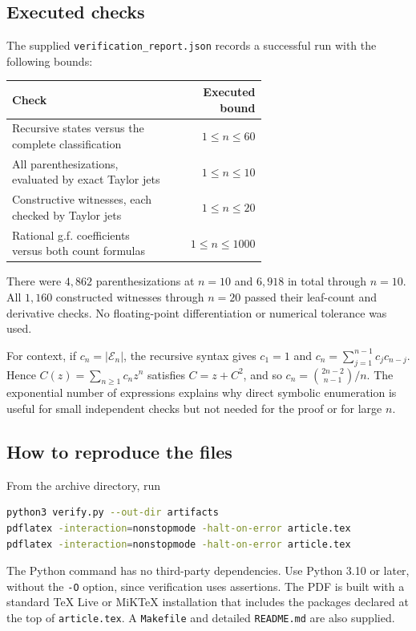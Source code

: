 \documentclass[11pt,letterpaper]{article}
\numberwithin{equation}{section}
\theoremstyle{definition}
\theoremstyle{remark}
\newcommand{\E}{\mathcal E}
\begin{document}
\subsection{Executed checks}
The supplied \texttt{verification\_report.json} records a successful run
with the following bounds:
\begin{center}
\begin{tabular}{@{}p{0.63\linewidth}r@{}}
\toprule
Check & Executed bound\\
\midrule
Recursive states versus the complete classification & $1\le n\le60$\\
All parenthesizations, evaluated by exact Taylor jets & $1\le n\le10$\\
Constructive witnesses, each checked by Taylor jets & $1\le n\le20$\\
Rational g.f. coefficients versus both count formulas & $1\le n\le1000$\\
\bottomrule
\end{tabular}
\end{center}
There were $4{,}862$ parenthesizations at $n=10$ and $6{,}918$
in total through $n=10$. All $1{,}160$ constructed witnesses through
$n=20$ passed their leaf-count and derivative checks.
No floating-point differentiation or numerical tolerance was used.

For context, if $c_n=|\E_n|$, the recursive syntax gives
$c_1=1$ and $c_n=\sum_{j=1}^{n-1}c_jc_{n-j}$.
Hence $C(z)=\sum_{n\ge1}c_nz^n$ satisfies $C=z+C^2$, and so
$c_n=\binom{2n-2}{n-1}/n$.
The exponential number of expressions explains why direct symbolic
enumeration is useful for small independent checks but not needed
for the proof or for large $n$.

\subsection{How to reproduce the files}
From the archive directory, run
\begin{lstlisting}[language=bash]
python3 verify.py --out-dir artifacts
pdflatex -interaction=nonstopmode -halt-on-error article.tex
pdflatex -interaction=nonstopmode -halt-on-error article.tex
\end{lstlisting}
The Python command has no third-party dependencies. Use Python 3.10 or
later, without the \texttt{-O} option, since verification uses assertions.
The PDF is built with a standard TeX Live or MiKTeX installation that
includes the packages declared at the top of \texttt{article.tex}.
A \texttt{Makefile} and detailed \texttt{README.md} are also supplied.
\end{document}

